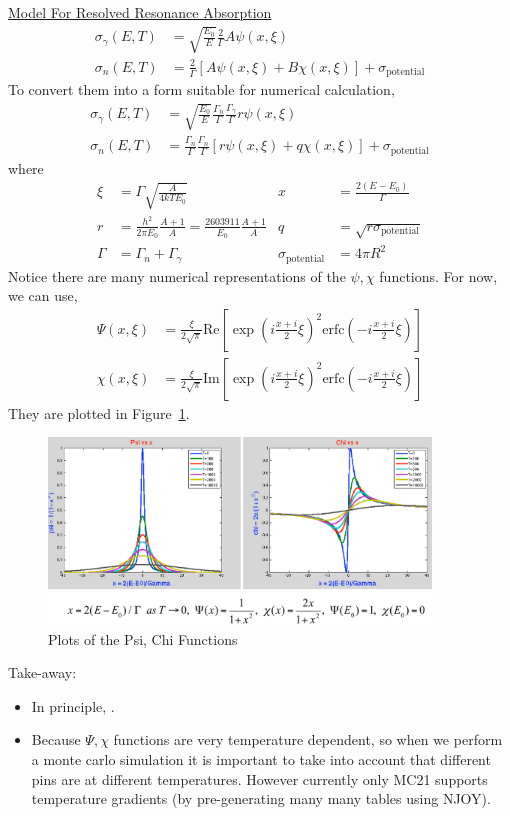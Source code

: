 \documentclass{school-22.211-notes}
\begin{document}
\uline{Model For Resolved Resonance Absorption}
\begin{align}
\sigma_{\gamma} (E,T) &= \sqrt{\frac{E_0}{E}} \frac{2}{\Gamma} A \psi(x,\xi) \\
\sigma_{n} (E,T) &= \frac{2}{\Gamma} \left[ A \psi(x,\xi) + B \chi(x,\xi) \right] + \sigma_{\mathrm{potential}} 
\end{align}
To convert them into a form suitable for numerical calculation,
\begin{align}
\sigma_{\gamma} (E,T) &= \sqrt{\frac{E_0}{E}} \frac{\Gamma_n}{\Gamma} \frac{\Gamma_{\gamma}}{\Gamma} r \psi(x,\xi) \\
\sigma_{n} (E,T) &= \frac{\Gamma_n}{\Gamma} \frac{\Gamma_n}{\Gamma} \left[ r \psi(x,\xi) + q \chi(x,\xi) \right] + \sigma_{\mathrm{potential}} 
\end{align}
where
\begin{align}
\xi &= \Gamma \sqrt{\frac{A}{4 k T E_0}}  & x &= \frac{2 (E-E_0)}{\Gamma} \\
r &= \frac{h^2}{2 \pi E_0} \frac{A+1}{A} = \frac{2603911}{E_0} \frac{A+1}{A} 
& q &= \sqrt{ r \sigma_{\mathrm{potential}} } \\
\Gamma &= \Gamma_n + \Gamma_{\gamma}  &\sigma_{\mathrm{potential}} &=  4 \pi R^2 
\end{align}
Notice there are many numerical representations of the $\psi, \chi$ functions. For now, we can use,
\begin{align}
\Psi(x,\xi) &= \frac{\xi}{2 \sqrt{\pi}} \mathrm{Re}\left[ \exp{\left( i \frac{x+i}{2} \xi \right)^2} \mathrm{erfc}\left( -i \frac{x+i}{2} \xi \right) \right] \\
\chi(x,\xi) &= \frac{\xi}{2 \sqrt{\pi}} \mathrm{Im}\left[ \exp{\left( i \frac{x+i}{2} \xi \right)^2} \mathrm{erfc}\left( -i \frac{x+i}{2} \xi \right) \right] 
\end{align}
They are plotted in Figure~\ref{psi-chi-plot}. 
\begin{figure}
  \centering
  \includegraphics[width=4in]{images/r-m/psi-chi-plot.png}
  \caption{Plots of the Psi, Chi Functions} \label{psi-chi-plot} 
\end{figure}
Take-away:
\begin{itemize}
\item In principle, . 
\item Because $\Psi, \chi$ functions are very temperature dependent, so when we perform a monte carlo simulation it is important to take into account that different pins are at different temperatures. However currently only MC21 supports temperature gradients (by pre-generating many many tables using NJOY). 
\end{itemize}
\end{document}
